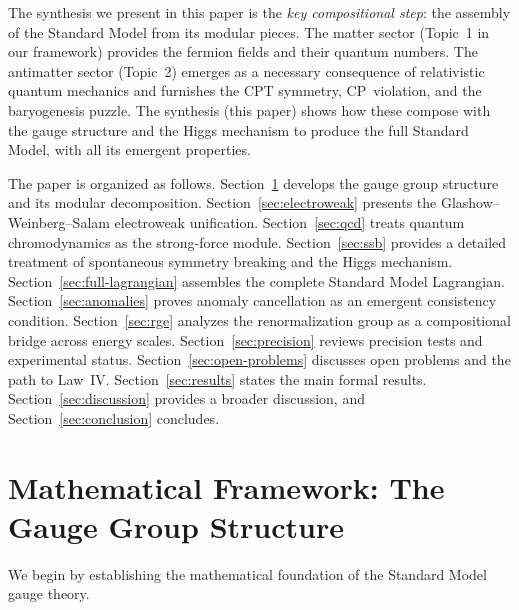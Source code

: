 \documentclass[12pt]{article}
\theoremstyle{definition}
\theoremstyle{remark}
\begin{document}
The synthesis we present in this paper is the \emph{key compositional step}: the assembly of the Standard Model from its modular pieces. The matter sector (Topic~1 in our framework) provides the fermion fields and their quantum numbers. The antimatter sector (Topic~2) emerges as a necessary consequence of relativistic quantum mechanics and furnishes the CPT symmetry, CP~violation, and the baryogenesis puzzle. The synthesis (this paper) shows how these compose with the gauge structure and the Higgs mechanism to produce the full Standard Model, with all its emergent properties.

The paper is organized as follows. Section~\ref{sec:gauge-structure} develops the gauge group structure and its modular decomposition. Section~\ref{sec:electroweak} presents the Glashow--Weinberg--Salam electroweak unification. Section~\ref{sec:qcd} treats quantum chromodynamics as the strong-force module. Section~\ref{sec:ssb} provides a detailed treatment of spontaneous symmetry breaking and the Higgs mechanism. Section~\ref{sec:full-lagrangian} assembles the complete Standard Model Lagrangian. Section~\ref{sec:anomalies} proves anomaly cancellation as an emergent consistency condition. Section~\ref{sec:rge} analyzes the renormalization group as a compositional bridge across energy scales. Section~\ref{sec:precision} reviews precision tests and experimental status. Section~\ref{sec:open-problems} discusses open problems and the path to Law~IV. Section~\ref{sec:results} states the main formal results. Section~\ref{sec:discussion} provides a broader discussion, and Section~\ref{sec:conclusion} concludes.


\section{Mathematical Framework: The Gauge Group Structure}
\label{sec:gauge-structure}

We begin by establishing the mathematical foundation of the Standard Model gauge theory.
\end{document}
